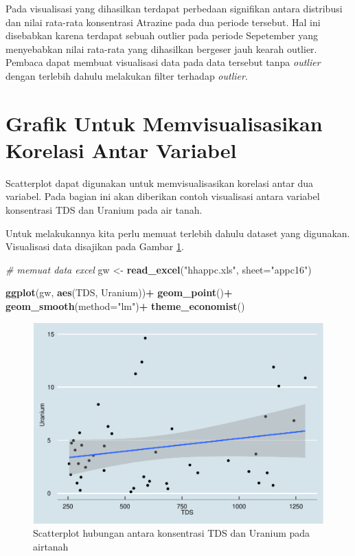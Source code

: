 \documentclass[]{book}
\newenvironment{Shaded}{\begin{snugshade}}{\end{snugshade}}
\newcommand{\KeywordTok}[1]{\textcolor[rgb]{0.13,0.29,0.53}{\textbf{#1}}}
\newcommand{\DataTypeTok}[1]{\textcolor[rgb]{0.13,0.29,0.53}{#1}}
\newcommand{\StringTok}[1]{\textcolor[rgb]{0.31,0.60,0.02}{#1}}
\newcommand{\CommentTok}[1]{\textcolor[rgb]{0.56,0.35,0.01}{\textit{#1}}}
\newcommand{\OperatorTok}[1]{\textcolor[rgb]{0.81,0.36,0.00}{\textbf{#1}}}
\newcommand{\NormalTok}[1]{#1}
\begin{document}
Pada visualisasi yang dihasilkan terdapat perbedaan signifikan antara
distribusi dan nilai rata-rata konsentrasi Atrazine pada dua periode
tersebut. Hal ini disebabkan karena terdapat sebuah outlier pada periode
Sepetember yang menyebabkan nilai rata-rata yang dihasilkan bergeser
jauh kearah outlier. Pembaca dapat membuat visualisasi data pada data
tersebut tanpa \emph{outlier} dengan terlebih dahulu melakukan filter
terhadap \emph{outlier}.

\section{Grafik Untuk Memvisualisasikan Korelasi Antar
Variabel}\label{grafik-untuk-memvisualisasikan-korelasi-antar-variabel}

Scatterplot dapat digunakan untuk memvisualisasikan korelasi antar dua
variabel. Pada bagian ini akan diberikan contoh visualisasi antara
variabel konsentrasi TDS dan Uranium pada air tanah.

Untuk melakukannya kita perlu memuat terlebih dahulu dataset yang
digunakan. Visualisasi data disajikan pada Gambar \ref{fig:scateda}.

\begin{Shaded}
\begin{Highlighting}[]
\CommentTok{# memuat data excel}
\NormalTok{gw <-}\StringTok{ }\KeywordTok{read_excel}\NormalTok{(}\StringTok{"hhappc.xls"}\NormalTok{, }\DataTypeTok{sheet=}\StringTok{"appc16"}\NormalTok{)}
\end{Highlighting}
\end{Shaded}

\begin{Shaded}
\begin{Highlighting}[]
\KeywordTok{ggplot}\NormalTok{(gw, }\KeywordTok{aes}\NormalTok{(TDS, Uranium))}\OperatorTok{+}
\StringTok{  }\KeywordTok{geom_point}\NormalTok{()}\OperatorTok{+}
\StringTok{  }\KeywordTok{geom_smooth}\NormalTok{(}\DataTypeTok{method=}\StringTok{"lm"}\NormalTok{)}\OperatorTok{+}
\StringTok{  }\KeywordTok{theme_economist}\NormalTok{()}
\end{Highlighting}
\end{Shaded}

\begin{figure}

{\centering \includegraphics[width=0.7\linewidth]{EnvStat_files/figure-latex/scateda-1} 

}

\caption{Scatterplot hubungan antara konsentrasi TDS dan Uranium pada airtanah}\label{fig:scateda}
\end{figure}
\end{document}
